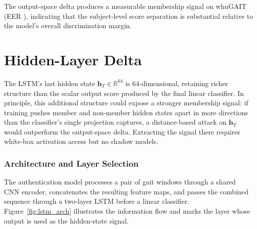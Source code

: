 The output-space delta produces a measurable membership signal on whuGAIT (EER \eerWhuGaitMIA{}), indicating that the subject-level score separation is substantial relative to the model's overall discrimination margin.

\section{Hidden-Layer Delta}
\label{sec:mia_hidden}

The LSTM's last hidden state $\mathbf{h}_T \in \mathbb{R}^{64}$ is 64-dimensional, retaining richer structure than the scalar output score produced by the final linear classifier. In principle, this additional structure could expose a stronger membership signal: if training pushes member and non-member hidden states apart in more directions than the classifier's single projection captures, a distance-based attack on $\mathbf{h}_T$ would outperform the output-space delta. Extracting the signal there requires white-box activation access but no shadow models.

\subsubsection{Architecture and Layer Selection}
\label{ssec:mia_hidden_arch}

The authentication model processes a pair of gait windows through a shared CNN encoder, concatenates the resulting feature maps, and passes the combined sequence through a two-layer LSTM before a linear classifier. Figure~\ref{fig:lstm_arch} illustrates the information flow and marks the layer whose output is used as the hidden-state signal.

